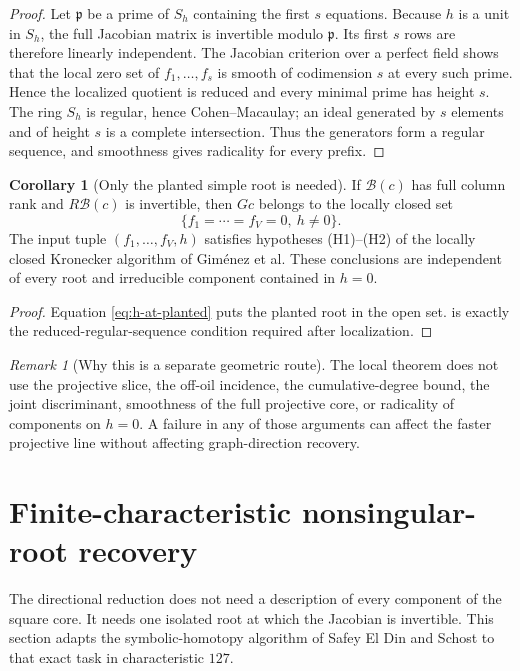 \documentclass[11pt,a4paper]{article}
\theoremstyle{definition}
\newtheorem{corollary}[theorem]{Corollary}
\theoremstyle{remark}
\newtheorem{remark}[theorem]{Remark}
\begin{document}
\begin{proof}
Let $\mathfrak p$ be a prime of $S_h$ containing the first $s$ equations.  Because $h$ is a unit in $S_h$, the full Jacobian matrix is invertible modulo $\mathfrak p$.  Its first $s$ rows are therefore linearly independent.  The Jacobian criterion over a perfect field shows that the local zero set of $f_1,\ldots,f_s$ is smooth of codimension $s$ at every such prime.  Hence the localized quotient is reduced and every minimal prime has height $s$.  The ring $S_h$ is regular, hence Cohen--Macaulay; an ideal generated by $s$ elements and of height $s$ is a complete intersection.  Thus the generators form a regular sequence, and smoothness gives radicality for every prefix.
\end{proof}

\begin{corollary}[Only the planted simple root is needed]\label{cor:local-hypotheses}
If $\mathcal B(c)$ has full column rank and $R\mathcal B(c)$ is invertible, then $Gc$ belongs to the locally closed set
\[
 \{f_1=\cdots=f_V=0,\ h\ne0\}.
\]
The input tuple $(f_1,\ldots,f_V,h)$ satisfies hypotheses (H1)--(H2) of the locally closed Kronecker algorithm of Gim\'enez et al.  These conclusions are independent of every root and irreducible component contained in $h=0$.
\end{corollary}

\begin{proof}
Equation \eqref{eq:h-at-planted} puts the planted root in the open set.   is exactly the reduced-regular-sequence condition required after localization.
\end{proof}

\begin{remark}[Why this is a separate geometric route]\label{rem:local-independent}
The local theorem does not use the projective slice, the off-oil incidence, the cumulative-degree bound, the joint discriminant, smoothness of the full projective core, or radicality of components on $h=0$.  A failure in any of those arguments can affect the faster projective line without affecting graph-direction recovery.
\end{remark}


\section{Finite-characteristic nonsingular-root recovery}\label{sec:finite-char-solver}

The directional reduction does not need a description of every component of the square core.  It needs one isolated root at which the Jacobian is invertible.  This section adapts the symbolic-homotopy algorithm of Safey El Din and Schost to that exact task in characteristic $127$.
\end{document}
